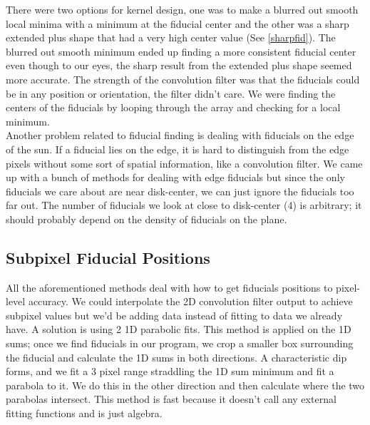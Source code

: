 \documentclass[10pt]{scrartcl}
\begin{document}
There were two options for kernel design, one was to make a blurred out smooth local minima with a minimum at the fiducial center and the other was a sharp extended plus shape that had a very high center value (See \cref{sharpfid}). The blurred out smooth minimum ended up finding a more consistent fiducial center even though to our eyes, the sharp result from the extended plus shape seemed more accurate. The strength of the convolution filter was that the fiducials could be in any position or orientation, the filter didn't care. We were finding the centers of the fiducials by looping through the array and checking for a local minimum. \\

Another problem related to fiducial finding is dealing with fiducials on the edge of the sun. If a fiducial lies on the edge, it is hard to distinguish from the edge pixels without some sort of spatial information, like a convolution filter. We came up with a bunch of methods for dealing with edge fiducials but since the only fiducials we care about are near disk-center, we can just ignore the fiducials too far out. The number of fiducials we look at close to disk-center (4) is arbitrary; it should probably depend on the density of fiducials on the plane. 

\subsection{Subpixel Fiducial Positions} %
\label{sub:subpixel_fiducial_positions}
All the aforementioned methods deal with how to get fiducials positions to pixel-level accuracy. We could interpolate the 2D convolution filter output to achieve subpixel values but we'd be adding data instead of fitting to data we already have. A solution is using 2 1D parabolic fits. This method is applied on the 1D sums; once we find fiducials in our program, we crop a smaller box surrounding the fiducial and calculate the 1D sums in both directions. A characteristic dip forms, and we fit a 3 pixel range straddling the 1D sum minimum and fit a parabola to it. We do this in the other direction and then calculate where the two parabolas intersect. This method is fast because it doesn't call any external fitting functions and is just algebra.  

\end{document}
